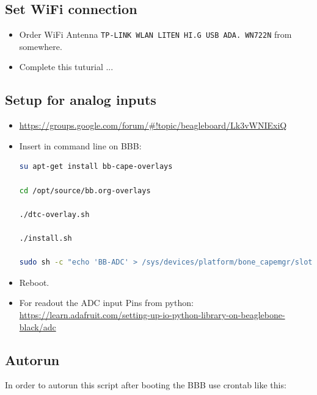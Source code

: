\documentclass[
	fontsize=10pt
	paper=a4
]{scrartcl}
\begin{document}
\subsection{Set WiFi connection}

\begin{itemize}

\item Order WiFi Antenna \texttt{TP-LINK WLAN LITEN HI.G USB ADA. WN722N} from somewhere.

\item Complete this tuturial ...

\end{itemize}



\subsection{Setup for analog inputs}

\begin{itemize}

\item \url{https://groups.google.com/forum/#!topic/beagleboard/Lk3vWNIExiQ}

\item Insert in command line on BBB:

\begin{lstlisting}[language=bash]
su apt-get install bb-cape-overlays

cd /opt/source/bb.org-overlays

./dtc-overlay.sh

./install.sh

sudo sh -c "echo 'BB-ADC' > /sys/devices/platform/bone_capemgr/slots"
\end{lstlisting}


\item Reboot.

\item For readout the ADC input Pins from python: \url{https://learn.adafruit.com/setting-up-io-python-library-on-beaglebone-black/adc}


\end{itemize}


\subsection{Autorun}

In order to autorun this script after booting the BBB use crontab like this:
\end{document}
